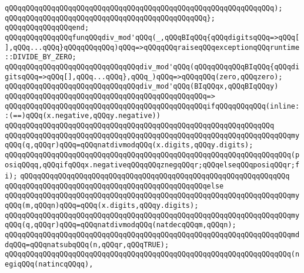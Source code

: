 \verb|qQQqqQQqqQQqqQQqqQQqqQQqqQQqqQQqqQQqqQQqqQQqqQQqqQQqqQQqqQQqqQQq);|\newline
\verb|qQQqqQQqqQQqqQQqqQQqqQQqqQQqqQQqqQQqqQQqqQQqqQQq};|\newline
\verb|qQQqqQQqqQQqqQQqend;|\newline
\newline
\verb|qQQqqQQqqQQqqQQqfunqQQqdiv_mod'qQQq(_,qQQqBIqQQq{qQQqdigitsqQQq=>qQQq[],qQQq...qQQq}qQQqqQQqqQQq)qQQq=>qQQqqQQqraiseqQQqexceptionqQQqruntime::DIVIDE_BY_ZERO;|\newline
\verb|qQQqqQQqqQQqqQQqqQQqqQQqqQQqqQQqdiv_mod'qQQq(qQQqqQQqqQQqBIqQQq{qQQqdigitsqQQq=>qQQq[],qQQq...qQQq},qQQq_)qQQq=>qQQqqQQq(zero,qQQqzero);|\newline
\newline
\verb|qQQqqQQqqQQqqQQqqQQqqQQqqQQqqQQqdiv_mod'qQQq(BIqQQqx,qQQqBIqQQqy)|\newline
\verb|qQQqqQQqqQQqqQQqqQQqqQQqqQQqqQQqqQQqqQQqqQQqqQQq=>|\newline
\verb|qQQqqQQqqQQqqQQqqQQqqQQqqQQqqQQqqQQqqQQqqQQqqQQqifqQQqqQQqqQQq(inline::(==)qQQq(x.negative,qQQqy.negative))|\newline
\verb|qQQqqQQqqQQqqQQqqQQqqQQqqQQqqQQqqQQqqQQqqQQqqQQqqQQqqQQqqQQqqQQq|\newline
\verb|qQQqqQQqqQQqqQQqqQQqqQQqqQQqqQQqqQQqqQQqqQQqqQQqqQQqqQQqqQQqqQQqqQQqmyqQQq(q,qQQqr)qQQq=qQQqnatdivmodqQQq(x.digits,qQQqy.digits);|\newline
\newline
\verb|qQQqqQQqqQQqqQQqqQQqqQQqqQQqqQQqqQQqqQQqqQQqqQQqqQQqqQQqqQQqqQQqqQQq(posiqQQqq,qQQqifqQQqx.negativeqQQqqQQqznegqQQqr;qQQqelseqQQqposiqQQqr;fi);|\newline
\verb|qQQqqQQqqQQqqQQqqQQqqQQqqQQqqQQqqQQqqQQqqQQqqQQqqQQqqQQqqQQqqQQq|\newline
\verb|qQQqqQQqqQQqqQQqqQQqqQQqqQQqqQQqqQQqqQQqqQQqqQQqelse|\newline
\verb|qQQqqQQqqQQqqQQqqQQqqQQqqQQqqQQqqQQqqQQqqQQqqQQqqQQqqQQqqQQqqQQqqQQqmyqQQq(m,qQQqn)qQQq=qQQq(x.digits,qQQqy.digits);|\newline
\verb|qQQqqQQqqQQqqQQqqQQqqQQqqQQqqQQqqQQqqQQqqQQqqQQqqQQqqQQqqQQqqQQqqQQqmyqQQq(q,qQQqr)qQQq=qQQqnatdivmodqQQq(natdecqQQqm,qQQqn);|\newline
\verb|qQQqqQQqqQQqqQQqqQQqqQQqqQQqqQQqqQQqqQQqqQQqqQQqqQQqqQQqqQQqqQQqqQQqmddqQQq=qQQqnatsubqQQq(n,qQQqr,qQQqTRUE);|\newline
\newline
\verb|qQQqqQQqqQQqqQQqqQQqqQQqqQQqqQQqqQQqqQQqqQQqqQQqqQQqqQQqqQQqqQQqqQQq(negiqQQq(natincqQQqq),|\newline
